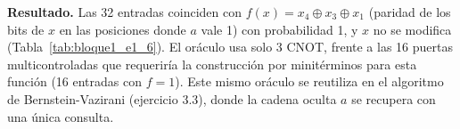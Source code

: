 \textbf{Resultado.} Las 32 entradas coinciden con $f(x)=x_4\oplus x_3\oplus x_1$ (paridad de los bits de $x$ en las posiciones donde $a$ vale 1) con probabilidad 1,
y $x$ no se modifica (Tabla~\ref{tab:bloque1_e1_6}). El oráculo usa solo 3 CNOT, frente a las 16 puertas multicontroladas que requeriría la construcción por minitérminos
para esta función (16 entradas con $f=1$). Este mismo oráculo se reutiliza en el algoritmo de Bernstein-Vazirani (ejercicio 3.3), donde la cadena oculta $a$ se recupera con una única consulta.